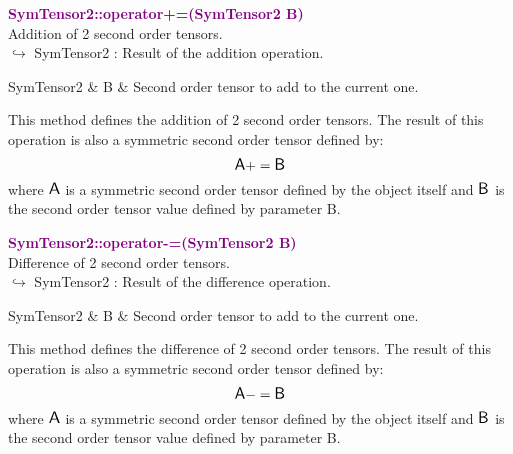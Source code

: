 \textcolor{purple}{\textbf{SymTensor2::operator+=(SymTensor2 B)}}\label{SymTensor2::operator+=(SymTensor2 B)}\\
Addition of 2 second order tensors.\\ \hspace*{10mm}$\hookrightarrow$ SymTensor2 : Result of the addition operation.

\begin{tcolorbox}[width=\textwidth,myArgs,tabularx={ll|R}]
SymTensor2 & B & Second order tensor to add to the current one.
\end{tcolorbox}

This method defines the addition of 2 second order tensors.
The result of this operation is also a symmetric second order tensor defined by:
\begin{equation*}
\mbox{\large\ensuremath{\mathsf{A}}} += \mbox{\large\ensuremath{\mathsf{B}}}
\end{equation*}
where $\mbox{\large\ensuremath{\mathsf{A}}}$ is a symmetric second order tensor defined by the object itself and $\mbox{\large\ensuremath{\mathsf{B}}}$ is the second order tensor value defined by parameter B.

\textcolor{purple}{\textbf{SymTensor2::operator-=(SymTensor2 B)}}\label{SymTensor2::operator-=(SymTensor2 B)}\\
Difference of 2 second order tensors.\\ \hspace*{10mm}$\hookrightarrow$ SymTensor2 : Result of the difference operation.

\begin{tcolorbox}[width=\textwidth,myArgs,tabularx={ll|R}]
SymTensor2 & B & Second order tensor to add to the current one.
\end{tcolorbox}

This method defines the difference of 2 second order tensors.
The result of this operation is also a symmetric second order tensor defined by:
\begin{equation*}
\mbox{\large\ensuremath{\mathsf{A}}} -= \mbox{\large\ensuremath{\mathsf{B}}}
\end{equation*}
where $\mbox{\large\ensuremath{\mathsf{A}}}$ is a symmetric second order tensor defined by the object itself and $\mbox{\large\ensuremath{\mathsf{B}}}$ is the second order tensor value defined by parameter B.

